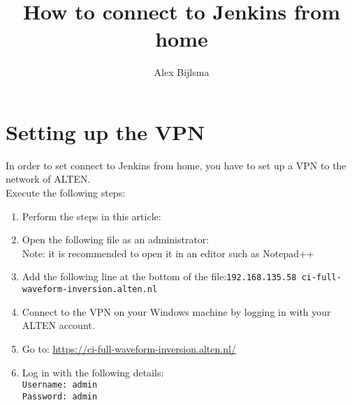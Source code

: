\documentclass{article}
\title{How to connect to Jenkins from home}
\author{Alex Bijlsma}
\begin{document}
\sloppy
	
\maketitle

\section{Setting up the VPN}
In order to set connect to Jenkins from home, you have to set up a VPN to the network of ALTEN. \\Execute the following steps:

\begin{enumerate}\setlength{\itemsep}{0pt}
	\item Perform the steps in this article:\\ 
	\item Open the following file as an administrator: 
	\\Note: it is recommended to open it in an editor such as Notepad++
	\item Add the following line at the bottom of the file:\newline \texttt{192.168.135.58 ci-full-waveform-inversion.alten.nl}
	\item Connect to the VPN on your Windows machine by logging in with your ALTEN account.
	\item Go to: \url{https://ci-full-waveform-inversion.alten.nl/}
	\item Log in with the following details:\\
	\texttt{Username: admin}\\
	\texttt{Password: admin}\\
\end{enumerate}
\end{document}
